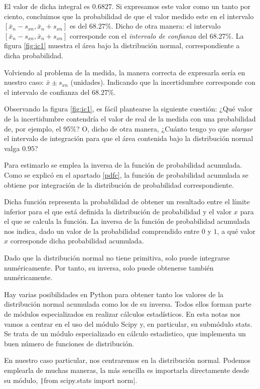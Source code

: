 \begin{paracol}{2}
El valor de dicha integral es $0.6827$. Si expresamos este valor como un tanto por ciento, concluimos que la probabilidad de que el valor medido este en el intervalo $[\bar{x}_n-s_{xn}, \bar{x}_n+s_{xn}]$ es del $68.27\%$. Dicho de otra manera: el intervalo $[\bar{x}_n-s_{xn}, \bar{x}_n+s_{xn}]$ corresponde con el \emph{intervalo de confianza} del 68.27\%. La figura \ref{fig:ic1} muestra el área bajo la distribución normal, correspondiente a dicha probabilidad.

Volviendo al problema de la medida, la manera correcta de expresarla sería en nuestro caso:  $\bar{x}\pm s_{xn}$ (unidades). Indicando que la incertidumbre corresponde con el intervalo de confianza del $68.27\%$.


Observando la figura \ref{fig:ic1}, es fácil plantearse la siguiente cuestión: ¿Qué valor de la incertidumbre contendría el valor de real de la medida con una probabilidad de, por ejemplo, el 95\%? O, dicho de otra manera, ¿Cuánto tengo yo que \emph{alargar} el intervalo de integración para que el área contenida bajo la distribución normal valga $0.95$?

Para estimarlo se emplea la inversa de la función de probabilidad acumulada. Como se explicó en el apartado \ref{pdfc}, la función de probabilidad acumulada se obtiene por integración de la distribución de probabilidad correspondiente. 

Dicha función representa la probabilidad de obtener un resultado entre el límite inferior para el que está definida la distribución de probabilidad y el valor $x$ para el que se calcula la función. La inversa de la función de probabilidad acumulada nos indica, dado un valor de la probabilidad comprendido entre $0$ y $1$, a qué valor $x$ corresponde dicha probabilidad acumulada. 

Dado que la distribución normal no tiene primitiva, solo puede integrarse numéricamente. Por tanto, su inversa, solo puede obtenerse también numéricamente. 

Hay varias posibilidades en Python para obtener tanto los valores de la distribución normal acumulada como los de su inversa. Todos ellos forman parte de módulos especializados en realizar cálculos estadísticos. En esta notas nos vamos a centrar en el uso del módulo Scipy y, en particular, su submódulo stats. Se trata de un módulo especializado en cálculo estadistico, que implementa un buen número de funciones de distribución. 

En nuestro caso particular, nos centraremos en la distribución normal. Podemos emplearla de muchas maneras, la más sencilla es importarla directamente desde su módulo, \texttt|from scipy.stats import norm|.


\end{paracol}
